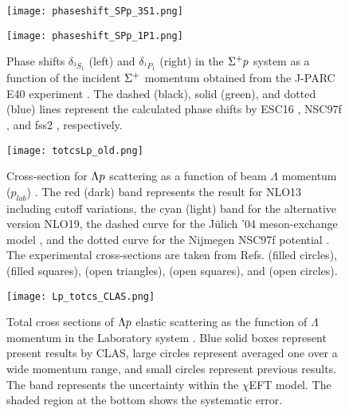 \begin{figure}[!h]
  \begin{minipage}[t]{0.48\columnwidth}
    \centering
    \texttt{[image: phaseshift\_SPp\_3S1.png]}
  \end{minipage}
  \hspace{0.04\columnwidth} %
  \begin{minipage}[t]{0.48\columnwidth}
    \centering
    \texttt{[image: phaseshift\_SPp\_1P1.png]}
  \end{minipage}
  \caption{Phase shifts $\delta_{^3S_1}$ (left) and $\delta_{^1P_1}$ (right) in the $\Sigma^{+}p$ system as a function of the incident $\Sigma^{+}$ momentum obtained from the J-PARC E40 experiment \cite{Nana-SPp}. The dashed (black), solid (green), and dotted (blue) lines represent the calculated phase shifts by ESC16 \cite{ESC16}, NSC97f \cite{OBE-1999}, and fss2 \cite{Fujiwara-2007}, respectively.}
  \label{fig-phaseshift_SPp}
\end{figure}

%
\begin{figure}[h!]
 \begin{center}
   \texttt{[image: totcsLp\_old.png]}
   \caption{Cross-section for $\Lambda p$ scattering as a function of beam $\Lambda$ momentum ($p_{lab}$) \cite{chiEFT-2020}. The red (dark) band represents the result for NLO13 \cite{NLO13} including cutoff variations, the cyan (light) band for the alternative version NLO19, the dashed curve for the J\"{u}lich '04 meson-exchange model \cite{Julich04}, and the dotted curve for the Nijmegen NSC97f potential \cite{NSC97f}. The experimental cross-sections are taken from Refs. \cite{Lp-1968_Sechi} (filled circles), \cite{Lp-1968_Alex} (filled squares), \cite{Lp-1967_Herndon} (open triangles), \cite{Lp-1971} (open squares), and \cite{Lp-1977_Hauptman} (open circles).}
   \label{fig-totcsLp_old}
 \end{center}
\end{figure}

\begin{figure}[h!]
 \begin{center}
   \texttt{[image: Lp\_totcs\_CLAS.png]}
   \caption{Total cross sections of $\Lambda p$ elastic scattering as the function of $\Lambda$ momentum in the Laboratory system  \cite{Lp-2021}. Blue solid boxes represent present results by CLAS, large circles represent averaged one over a wide momentum range, and small circles represent previous results. The band represents the uncertainty within the $\chi$EFT model. The shaded region at the bottom shows the systematic error.}
   \label{fig-Lp_totcs_CLAS}
 \end{center}
\end{figure}

